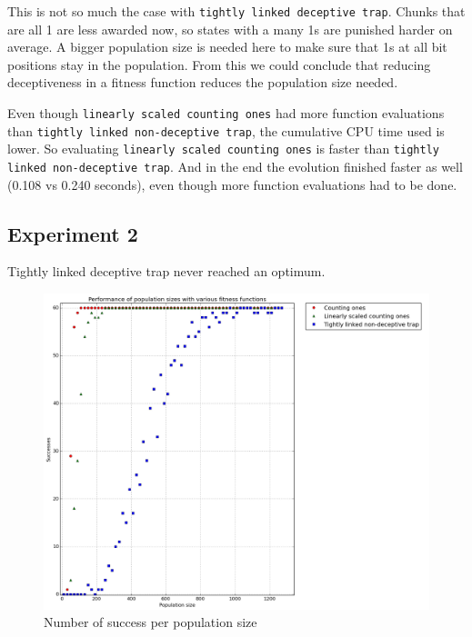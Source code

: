 \documentclass[12pt]{article}
\theoremstyle{definition}
\newcommand{\lsco}{\texttt{linearly scaled counting ones}}
\newcommand{\tdt}{\texttt{tightly linked deceptive trap}}
\newcommand{\tnt}{\texttt{tightly linked non-deceptive trap}}
\begin{document}
This is not so much the case with \tdt{}.
Chunks that are all 1 are less awarded now, so states with a many 1s are punished harder
on average.
A bigger population size is needed here to make sure that 1s at all bit positions stay in the
population.
From this we could conclude that reducing deceptiveness in a fitness function
reduces the population size needed.

Even though \lsco{} had more function evaluations than \tnt{}, the cumulative CPU time used
is lower.
So evaluating \lsco{} is faster than \tnt{}.
And in the end the evolution finished faster as well (0.108 vs 0.240 seconds),
even though more function evaluations had to be done.


\subsection*{Experiment 2}
\label{exp2}
Tightly linked deceptive trap never reached an optimum.

\begin{figure}[H]
    \centering
    \includegraphics[totalheight=0.7\textheight]{images/exp2.png}
    \caption{Number of success per population size}
\label{fig:exp2}
\end{figure}
\end{document}

